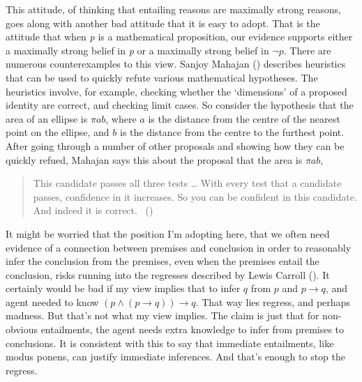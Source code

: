 \documentclass[
  10pt,
  letterpaper,
  twoside]{scrbook}
\begin{document}
This attitude, of thinking that entailing reasons are maximally strong
reasons, goes along with another bad attitude that it is easy to adopt.
That is the attitude that when \emph{p} is a mathematical proposition,
our evidence supports either a maximally strong belief in \emph{p} or a
maximally strong belief in \(\neg p\). There are numerous
counterexamples to this view. Sanjoy Mahajan
() describes heuristics that can be used
to quickly refute various mathematical hypotheses. The heuristics
involve, for example, checking whether the `dimensions' of a proposed
identity are correct, and checking limit cases. So consider the
hypothesis that the area of an ellipse is \(\pi ab\), where \(a\) is the
distance from the centre of the nearest point on the ellipse, and \(b\)
is the distance from the centre to the furthest point. After going
through a number of other proposals and showing how they can be quickly
refued, Mahajan says this about the proposal that the area is
\(\pi ab\),

\begin{quote}
This candidate passes all three tests \ldots{} With every test that a
candidate passes, confidence in it increases. So you can be confident in
this candidate. And indeed it is correct.
~()
\end{quote}

It might be worried that the position I'm adopting here, that we often
need evidence of a connection between premises and conclusion in order
to reasonably infer the conclusion from the premises, even when the
premises entail the conclusion, risks running into the regresses
described by Lewis Carroll (). It
certainly would be bad if my view implies that to infer \(q\) from \(p\)
and \(p \rightarrow q\), and agent needed to know
\((p \wedge (p \rightarrow q)) \rightarrow q\). That way lies regress,
and perhaps madness. But that's not what my view implies. The claim is
just that for non-obvious entailments, the agent needs extra knowledge
to infer from premises to conclusions. It is consistent with this to say
that immediate entailments, like modus ponens, can justify immediate
inferences. And that's enough to stop the regress.
\end{document}
